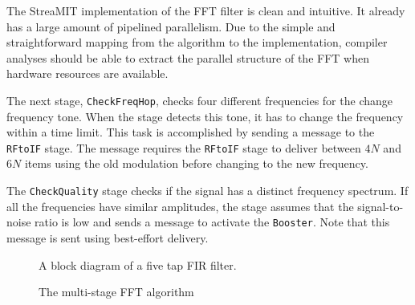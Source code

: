 The StreaMIT implementation of the FFT filter is clean and
intuitive. It already has a large amount of pipelined parallelism. Due
to the simple and straightforward mapping from the algorithm to the
implementation, compiler analyses should be able to extract the
parallel structure of the FFT when hardware resources are available.

The next stage, {\tt CheckFreqHop}, checks four different frequencies
for the change frequency tone. When the stage detects this tone, it
has to change the frequency within a time limit. This task is
accomplished by sending a message to the {\tt RFtoIF} stage.  The
message requires the {\tt RFtoIF} stage to deliver between $4N$ and
$6N$ items using the old modulation before changing to the new
frequency.

The {\tt CheckQuality} stage checks if the signal has a distinct
frequency spectrum. If all the frequencies have similar amplitudes,
the stage assumes that the signal-to-noise ratio is low and sends a
message to activate the {\tt Booster}. Note that this message is sent
using best-effort delivery.

\begin{figure}[t]
\centering
{}
\caption{A block diagram of a five tap FIR filter.}
\label{fig:firfilter}
\end{figure}

\begin{figure}[t]
\centering
{}
\caption{The multi-stage FFT algorithm}
\label{fig:fftfilter}
\end{figure}